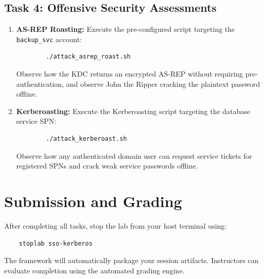 \subsection{Task 4: Offensive Security Assessments}
\begin{enumerate}
    \item {\bf AS-REP Roasting:} Execute the pre-configured script targeting the {\tt backup\_svc} account:
    \begin{verbatim}
        ./attack_asrep_roast.sh
    \end{verbatim}
    Observe how the KDC returns an encrypted AS-REP without requiring pre-authentication, and observe John the Ripper cracking the plaintext password offline.
    \item {\bf Kerberoasting:} Execute the Kerberoasting script targeting the database service SPN:
    \begin{verbatim}
        ./attack_kerberoast.sh
    \end{verbatim}
    Observe how any authenticated domain user can request service tickets for registered SPNs and crack weak service passwords offline.
\end{enumerate}

\section{Submission and Grading}
After completing all tasks, stop the lab from your host terminal using:
\begin{verbatim}
    stoplab sso-kerberos
\end{verbatim}
The framework will automatically package your session artifacts. Instructors can evaluate completion using the automated grading engine.


